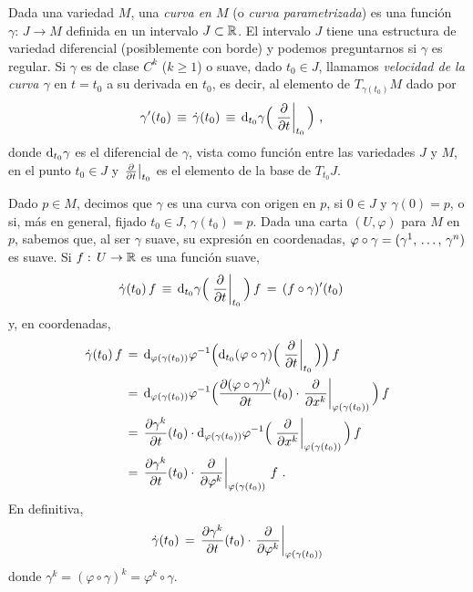 \theoremstyle{plain}
\newtheorem{propoTodoTangenteEsVelocidad}{Proposici\'{o}n}[section]

\theoremstyle{remark}


Dada una variedad $M$, una \emph{curva en $M$} (o \emph{curva parametrizada})
es una funci\'{o}n $\gamma:\,J\rightarrow M$ definida en un intervalo
$J\subset\mathbb{R}$. El intervalo $J$ tiene una estructura de variedad
diferencial (posiblemente con borde) y podemos preguntarnos si $\gamma$ es
regular. Si $\gamma$ es de clase $C^{k}$ ($k\geq 1$) o suave, dado
$t_{0}\in J$, llamamos \emph{velocidad de la curva $\gamma$} en $t=t_{0}$ a
su derivada en $t_{0}$, es decir, al elemento de $T_{\gamma(t_{0})}M$ dado por
\begin{align*}
	\gamma'(t_{0}) & \,\equiv\,\dot{\gamma}(t_{0}) \,\equiv\,
		\diferencial[t_{0}]{\gamma}\Big(\gancho[t_{0}]{t}\Big)
	\text{ ,}
\end{align*}
%
donde $\diferencial[t_{0}]{\gamma}$ es el diferencial de $\gamma$, vista
como funci\'{o}n entre las variedades $J$ y $M$, en el punto $t_{0}\in J$
y $\gancho[t_{0}]{t}$ es el elemento de la base de $T_{t_{0}}J$.

Dado $p\in M$, decimos que $\gamma$ es una curva con origen en $p$, si
$0\in J$ y $\gamma(0)=p$, o si, m\'{a}s en general, fijado $t_{0}\in J$,
$\gamma(t_{0})=p$. Dada una carta $(U,\varphi)$ para $M$ en $p$, sabemos que,
al ser $\gamma$ suave, su expresi\'{o}n en coordenadas, $\varphi\circ\gamma=%
(\lista*{\gamma}{n})$ es suave. Si $f:\,U\rightarrow\mathbb{R}$ es una
funci\'{o}n suave,
\begin{align*}
	\dot{\gamma}(t_{0})\,f & \,\equiv\,\diferencial[t_{0}]{\gamma}
		\Big(\gancho[t_{0}]{t}\Big)\,f \,=\,
		(f\circ\gamma)'(t_{0})
\end{align*}
%
y, en coordenadas,
\begin{align*}
	\dot{\gamma}(t_{0})\,f & \,=\,
		\diferencial[\varphi(\gamma(t_{0}))]{\varphi^{-1}}\Big(
		\diferencial[t_{0}]{(\varphi\circ\gamma)}\Big(
		\gancho[t_{0}]{t}\Big)\Big)\,f \\
	& \,=\,\diferencial[\varphi(\gamma(t_{0}))]{\varphi^{-1}}\Big(
		\derivada{(\varphi\circ\gamma)^{k}}{t}(t_{0})\cdot
		\gancho[\varphi(\gamma(t_{0}))]{x^{k}}\Big)\,f \\
	& \,=\,\derivada{\gamma^{k}}{t}(t_{0})\cdot
		\diferencial[\varphi(\gamma(t_{0}))]{\varphi^{-1}}
		\Big(\gancho[\varphi(\gamma(t_{0}))]{x^{k}}\Big)\,f \\
	& \,=\,\derivada{\gamma^{k}}{t}(t_{0})\cdot
		\gancho[\varphi(\gamma(t_{0}))]{\varphi^{k}}\,f
	\text{ .}
\end{align*}
%
En definitiva,
\begin{equation}
	\label{eq:velocidaddeunacurva}
	\dot{\gamma}(t_{0}) \,=\,\derivada{\gamma^{k}}{t}(t_{0})\cdot
		\gancho[\varphi(\gamma(t_{0}))]{\varphi^{k}}
\end{equation}
%
donde $\gamma^{k}=(\varphi\circ\gamma)^{k}=\varphi^{k}\circ\gamma$.


